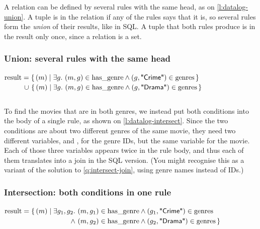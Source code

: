 A relation can be defined by several rules with the same head, as on \autoref{l:datalog-union}.
A tuple is in the relation if any of the rules says that it is, so several rules form the \emph{union} of their results, like  in SQL.
A tuple that both rules produce is in the result only once, since a relation is a set.

\begin{frame}
    \label{s:datalog-union}
    \frametitle{Union: several rules with the same head}
    \vspace{0.3em}
    {\footnotesize
    $\mathrm{result} = \{\, (m) \mid \exists g.\ (m, g) \in \mathrm{has\_genre} \wedge (g, \text{\textsf{"Crime"}}) \in \mathrm{genres} \,\}$\\
    $\hphantom{\ra{result} = {}}\llap{$\cup\ $}\{\, (m) \mid \exists g.\ (m, g) \in \ra{has\_genre} \wedge (g, \lit{Drama}) \in \ra{genres} \,\}$}
    \par\vspace{0.3em}
    \inputminted[fontsize=\footnotesize]{sql}{code/datalog-union.sql}
\end{frame}
\label{l:datalog-union}

To find the movies that are in both genres, we instead put both conditions into the body of a single rule, as shown on \autoref{l:datalog-intersect}.
Since the two conditions are about two different genres of the same movie, they need two different variables,  and , for the genre IDs, but the same variable  for the movie.
Each of those three variables appears twice in the rule body, and thus each of them translates into a join in the SQL version.
(You might recognise this as a variant of the solution to \autoref{q:intersect-join}, using genre names instead of IDs.)

\begin{frame}
    \label{s:datalog-intersect}
    \frametitle{Intersection: both conditions in one rule}
    \vspace{0.3em}
    {\footnotesize
    $\mathrm{result} = \{\, (m) \mid \exists g_1, g_2.\ (m, g_1) \in \mathrm{has\_genre} \wedge (g_1, \text{\textsf{"Crime"}}) \in \mathrm{genres}$\\
    $\hphantom{\ra{result} = \{\, (m) \mid \exists g_1, g_2.\ }\llap{$\wedge\ $}(m, g_2) \in \ra{has\_genre} \wedge (g_2, \lit{Drama}) \in \ra{genres} \,\}$}
    \par\vspace{0.3em}
    \inputminted[fontsize=\footnotesize]{sql}{code/datalog-intersect.sql}
\end{frame}
\label{l:datalog-intersect}

